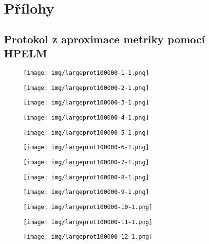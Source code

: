 \chapter*{Přílohy}
\renewcommand{\thesection}{\Alph{section}}

\section{Protokol z aproximace metriky pomocí HPELM}
\label{app:protocol}
\begin{figure}[H]
	\centering
	\texttt{[image: img/largeprot100000-1-1.png]}
\end{figure}
\begin{figure}[H]
	\centering
	\texttt{[image: img/largeprot100000-2-1.png]}
\end{figure}
\begin{figure}[H]
	\centering
	\texttt{[image: img/largeprot100000-3-1.png]}
\end{figure}
\begin{figure}[H]
	\centering
	\texttt{[image: img/largeprot100000-4-1.png]}
\end{figure}
\begin{figure}[H]
	\centering
	\texttt{[image: img/largeprot100000-5-1.png]}
\end{figure}
\begin{figure}[H]
	\centering
	\texttt{[image: img/largeprot100000-6-1.png]}
\end{figure}
\begin{figure}[H]
	\centering
	\texttt{[image: img/largeprot100000-7-1.png]}
\end{figure}
\begin{figure}[H]
	\centering
	\texttt{[image: img/largeprot100000-8-1.png]}
\end{figure}
\begin{figure}[H]
	\centering
	\texttt{[image: img/largeprot100000-9-1.png]}
\end{figure}
\begin{figure}[H]
	\centering
	\texttt{[image: img/largeprot100000-10-1.png]}
\end{figure}
\begin{figure}[H]
	\centering
	\texttt{[image: img/largeprot100000-11-1.png]}
\end{figure}
\begin{figure}[H]
	\centering
	\texttt{[image: img/largeprot100000-12-1.png]}
\end{figure}
